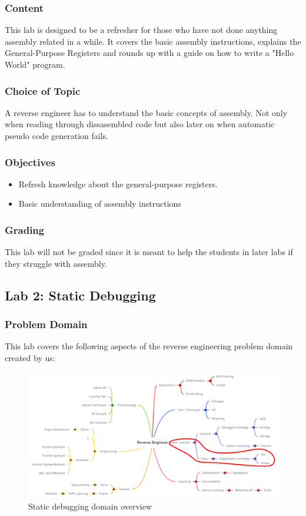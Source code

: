 \subsubsection*{Content}
This lab is designed to be a refresher for those who have not done anything assembly related in a while. It covers the basic assembly instructions, explains the General-Purpose Registers and rounds up with a guide on how to write a "Hello World" program.  
\subsubsection*{Choice of Topic}
A reverse engineer has to understand the basic concepts of assembly. Not only when reading through dissasembled code but also later on when automatic pseudo code generation fails.
\subsubsection*{Objectives}
\begin{itemize}
    \item Refresh knowledge about the general-purpose registers.
    \item Basic understanding of assembly instructions
\end{itemize}
\subsubsection*{Grading}
This lab will not be graded since it is meant to help the students in later labs if they struggle with assembly.
\pagebreak

\subsection{Lab 2: Static Debugging}
\subsubsection*{Problem Domain}
This lab covers the following aspects of the reverse engineering problem domain created by us:
\vspace{-2ex}
\begin{figure}[H]
    \includegraphics[width=\textwidth]{resources/static-overview-light.png}
    \caption{Static debugging domain overview}
    \label{fig:static-overview}
\end{figure}
